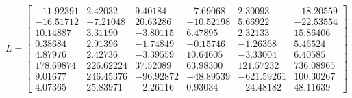 \documentclass[10pt,a4paper]{article}
\begin{document}
\[ L =
\begin{bmatrix}
   -11.92391 &    2.42032 &    9.40184 &   -7.69068 &    2.30093 &  -18.20559 \\
   -16.51712 &   -7.21048 &   20.63286 &  -10.52198 &    5.66922 &  -22.53554 \\
    10.14887 &    3.31190 &   -3.80115 &    6.47895 &    2.32133 &   15.86406 \\
     0.38684 &    2.91396 &   -1.74849 &   -0.15746 &   -1.26368 &    5.46524 \\
     4.87976 &    2.42736 &   -3.39559 &   10.64605 &   -3.33004 &    6.40585 \\
   178.69874 &  226.62224 &   37.52089 &   63.98300 &  121.57232 &  736.08965 \\
     9.01677 &  246.45376 &  -96.92872 &  -48.89539 & -621.59261 &  100.30267 \\ 
     4.07365 &   25.83971 &   -2.26116 &    0.93034 &  -24.48182 &   48.11639
\end{bmatrix} \]
\end{document}
